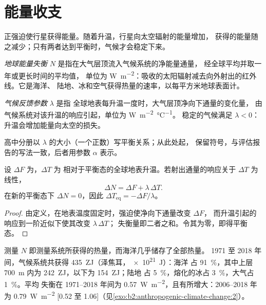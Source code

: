 \section{能量收支}\label{sec:b2:anthropogenic-climate-change:energy}

正强迫使行星获得能量。随着升温，行星向太空辐射的能量增加，
获得的能量随之减少；只有两者达到平衡时，气候才会稳定下来。

\begin{definition}\label{def:b2:anthropogenic-climate-change:eei}
\emph{地球能量失衡} $N$ 是指在大气层顶流入气候系统的净能量通量，
经全球平均并取一年或更长时间的平均值，
单位为 \unit{W.m^{-2}}：吸收的太阳辐射减去向外射出的红外线。它是海洋、
陆地、冰和空气获得热量的速率，以每平方米地球表面计。
\end{definition}

\begin{definition}[气候反馈参数]\label{def:b2:anthropogenic-climate-change:lambda}
\emph{气候反馈参数} $\lambda$ 是指
全球地表每升温一度时，大气层顶净向下通量的变化量，
由气候系统对该升温的响应引起，单位为 \unit{W.m^{-2}.\celsius^{-1}}。
稳定的气候满足 $\lambda < 0$：升温会增加能量向太空的损失。
\end{definition}

高中分册以 $\lambda$ 的大小（一个正数）写平衡关系；从此处起，
保留符号，与评估报告的写法一致，后者用参数 $\alpha$ 表示。

\begin{proposition}[全球能量平衡]\label{prop:b2:anthropogenic-climate-change:balance}
设 $\Delta F$ 为，$\Delta T$ 为
相对于平衡态的全球地表升温。若射出通量的响应关于 $\Delta T$ 为线性，
\[
  \Delta N = \Delta F + \lambda\,\Delta T .
\]
在新的平衡态下 $\Delta N = 0$，因此 $\Delta T_{\text{eq}} = -\Delta F/\lambda$。
\end{proposition}
\begin{proof}
由定义，在地表温度固定时，强迫使净向下通量改变 $\Delta F$，
而升温引起的响应到一阶近似下使其改变 $\lambda\,\Delta T$；
失衡量即二者之和。令其为零，即得平衡态。
\end{proof}

测量 $N$ 即测量系统所获得的热量，而海洋几乎储存了全部热量。
1971 至 2018 年间，气候系统共获得 \qty{435}{ZJ}（泽焦耳，\qty{e21}{J}）：海洋
占 \qty{91}{\percent}，其中上层 \qty{700}{m} 内为 \qty{242}{ZJ}，以下为 \qty{154}{ZJ}；陆地
占 \qty{5}{\percent}，熔化的冰占 \qty{3}{\percent}，大气占 \qty{1}{\percent}。平均
失衡在 1971--2018 年间为 \qty{0.57}{W.m^{-2}}，且有所增大：2006--2018 年为 \qty{0.79}{W.m^{-2}}
[0.52 至 1.06]（见\cref{exo:b2:anthropogenic-climate-change:2}）。

